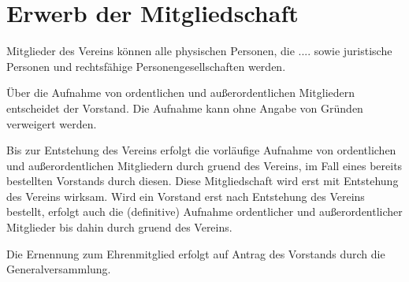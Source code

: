\documentclass{article}
\begin{document}
\section{Erwerb der Mitgliedschaft}
\begin{absatz}
    \item Mitglieder des Vereins können alle physischen Personen, die
    ....
    sowie juristische Personen und rechtsfähige Personengesellschaften
    werden.
    \item Über die Aufnahme von ordentlichen und außerordentlichen Mitgliedern entscheidet der Vorstand. Die Aufnahme kann ohne Angabe von Gründen verweigert werden.
    \item Bis zur Entstehung des Vereins erfolgt die vorläufige Aufnahme von ordentlichen und außerordentlichen Mitgliedern durch \gls{gruend} des Vereins, im Fall eines bereits bestellten Vorstands durch diesen. Diese Mitgliedschaft wird erst mit Entstehung des Vereins wirksam. Wird ein Vorstand erst nach Entstehung des Vereins bestellt, erfolgt auch die (definitive) Aufnahme ordentlicher und außerordentlicher Mitglieder bis dahin durch \gls{gruend} des Vereins.
    \item Die Ernennung zum Ehrenmitglied erfolgt auf Antrag des Vorstands durch die Generalversammlung.
\end{absatz}
\end{document}
